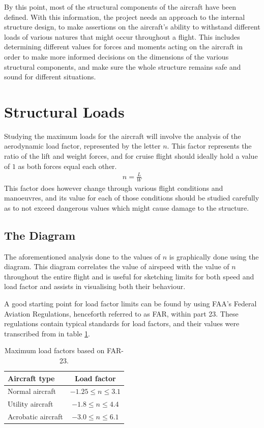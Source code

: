 \documentclass[english,fira]{ist-report}
\begin{document}
By this point, most of the structural components of the aircraft have been defined. With this information, the project needs an approach to the internal structure design, to make assertions on the aircraft's ability to withstand different loads of various natures that might occur throughout a flight. This includes determining different values for forces and moments acting on the aircraft in order to make more informed decisions on the dimensions of the various structural components, and make sure the whole structure remains safe and sound for different situations.

\section{Structural Loads}

Studying the maximum loads for the aircraft will involve the analysis of the aerodynamic load factor, represented by the letter $n$. This factor represents the ratio of the lift and weight forces, and for cruise flight should ideally hold a value of $1$ as both forces equal each other.
\begin{gather}
    n = \frac{L}{W}
\end{gather}
This factor does however change through various flight conditions and manoeuvres, and its value for each of those conditions should be studied carefully as to not exceed dangerous values which might cause damage to the structure.

\subsection{The \vnd{} Diagram}

The aforementioned analysis done to the values of $n$ is graphically done using the \vnd{} diagram. This diagram correlates the value of airspeed with the value of $n$ throughout the entire flight and is useful for sketching limits for both speed and load factor and assists in visualising both their behaviour.

A good starting point for load factor limits can be found by using FAA's Federal Aviation Regulations, henceforth referred to as FAR, within part 23. These regulations contain typical standards for load factors, and their values were transcribed from  in table \ref{tab:far23}.
\begin{table}[ht]
    \centering
    \begin{tabular}{l c}\toprule
        Aircraft type       & Load factor               \\
        \midrule
        Normal aircraft     & $-1.25 \leq n \leq 3.1$   \\
        Utility aircraft    & $-1.8 \leq n \leq 4.4$    \\
        Acrobatic aircraft  & $-3.0 \leq n \leq 6.1$    \\
        \bottomrule
    \end{tabular}
    \caption{Maximum load factors based on FAR-23.}
    \label{tab:far23}
\end{table}
\end{document}
